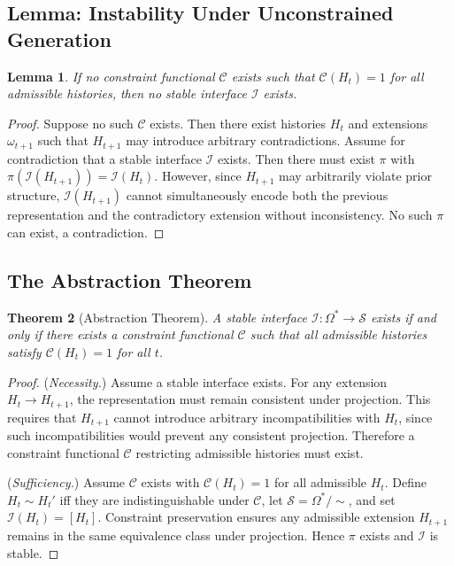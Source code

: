 \documentclass[12pt, a4paper]{article}
\theoremstyle{plain}
\newtheorem{theorem}{Theorem}[section]
\newtheorem{lemma}[theorem]{Lemma}
\theoremstyle{definition}
\theoremstyle{remark}
\begin{document}
\subsection{Lemma: Instability Under Unconstrained Generation}

\begin{lemma}
If no constraint functional $\mathcal{C}$ exists such that $\mathcal{C}(H_t) = 1$ for all admissible histories, then no stable interface $\mathcal{I}$ exists.
\end{lemma}

\begin{proof}
Suppose no such $\mathcal{C}$ exists. Then there exist histories $H_t$ and extensions $\omega_{t+1}$ such that $H_{t+1}$ may introduce arbitrary contradictions. Assume for contradiction that a stable interface $\mathcal{I}$ exists. Then there must exist $\pi$ with $\pi(\mathcal{I}(H_{t+1})) = \mathcal{I}(H_t)$. However, since $H_{t+1}$ may arbitrarily violate prior structure, $\mathcal{I}(H_{t+1})$ cannot simultaneously encode both the previous representation and the contradictory extension without inconsistency. No such $\pi$ can exist, a contradiction.
\end{proof}

\subsection{The Abstraction Theorem}

\begin{theorem}[Abstraction Theorem]
\label{thm:abstraction}
A stable interface $\mathcal{I} : \Omega^* \to \mathcal{S}$ exists if and only if there exists a constraint functional $\mathcal{C}$ such that all admissible histories satisfy $\mathcal{C}(H_t) = 1$ for all $t$.
\end{theorem}

\begin{proof}
(\textit{Necessity.}) Assume a stable interface exists. For any extension $H_t \to H_{t+1}$, the representation must remain consistent under projection. This requires that $H_{t+1}$ cannot introduce arbitrary incompatibilities with $H_t$, since such incompatibilities would prevent any consistent projection. Therefore a constraint functional $\mathcal{C}$ restricting admissible histories must exist.

(\textit{Sufficiency.}) Assume $\mathcal{C}$ exists with $\mathcal{C}(H_t) = 1$ for all admissible $H_t$. Define $H_t \sim H_t'$ iff they are indistinguishable under $\mathcal{C}$, let $\mathcal{S} = \Omega^*/{\sim}$, and set $\mathcal{I}(H_t) = [H_t]$. Constraint preservation ensures any admissible extension $H_{t+1}$ remains in the same equivalence class under projection. Hence $\pi$ exists and $\mathcal{I}$ is stable.
\end{proof}
\end{document}
